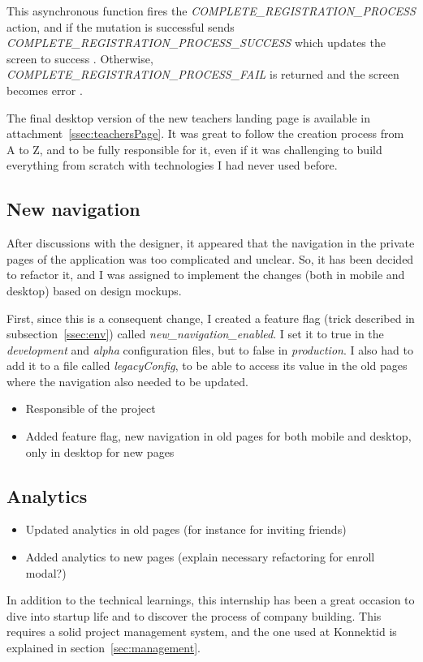 This asynchronous function fires the \textit{COMPLETE\_REGISTRATION\_PROCESS} action, and if the mutation is successful sends \textit{COMPLETE\_REGISTRATION\_PROCESS\_SUCCESS} which updates the screen to \guillemotleft{} success \guillemotright{}. Otherwise, \textit{COMPLETE\_REGISTRATION\_PROCESS\_FAIL} is returned and the screen becomes \guillemotleft{} error \guillemotright{}.

The final desktop version of the new teachers landing page is available in {\sc attachment}~\ref{ssec:teachersPage}. It was great to follow the creation process from A to Z, and to be fully responsible for it, even if it was challenging to build everything from scratch with technologies I had never used before.

\subsection{New navigation}
\label{ssec:new_nav}

After discussions with the designer, it appeared that the navigation in the private pages of the application was too complicated and unclear. So, it has been decided to refactor it, and I was assigned to implement the changes (both in mobile and desktop) based on design mockups.

First, since this is a consequent change, I created a feature flag (trick described in {\sc subsection}~\ref{ssec:env}) called \textit{new\_navigation\_enabled}. I set it to true in the \textit{development} and \textit{alpha} configuration files, but to false in \textit{production}. I also had to add it to a file called \textit{legacyConfig}, to be able to access its value in the old pages where the navigation also needed to be updated.

\begin{itemize}
    \item Responsible of the project
    \item Added feature flag, new navigation in old pages for both mobile and desktop, only in desktop for new pages
\end{itemize}

\subsection{Analytics}
\label{ssec:analytics}

\begin{itemize}
    \item Updated analytics in old pages (for instance for inviting friends)
    \item Added analytics to new pages (explain necessary refactoring for enroll modal?)
\end{itemize}

In addition to the technical learnings, this internship has been a great occasion to dive into startup life and to discover the process of company building. This requires a solid project management system, and the one used at Konnektid is explained in {\sc section}~\ref{sec:management}.